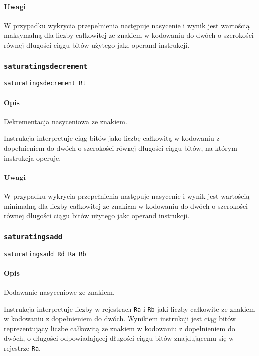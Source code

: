 \paragraph*{Uwagi}

W przypadku wykrycia przepełnienia następuje nasycenie i wynik jest wartością
maksymalną dla liczby całkowitej ze znakiem w kodowaniu do dwóch o szerokości
równej długości ciągu bitów użytego jako operand instrukcji.

\subsubsection{\texttt{saturatingsdecrement}}

\begin{lstlisting}
saturatingsdecrement Rt
\end{lstlisting}

\paragraph*{Opis} Dekrementacja nasyceniowa ze znakiem.

Instrukcja interpretuje ciąg bitów jako liczbę całkowitą w kodowaniu z
dopełnieniem do dwóch o szerokości równej długości ciągu bitów, na którym
instrukcja operuje.

\paragraph*{Uwagi}

W przypadku wykrycia przepełnienia następuje nasycenie i wynik jest wartością
minimalną dla liczby całkowitej ze znakiem w kodowaniu do dwóch o szerokości
równej długości ciągu bitów użytego jako operand instrukcji.

\subsubsection{\texttt{saturatingsadd}}

\begin{lstlisting}
saturatingsadd Rd Ra Rb
\end{lstlisting}

\paragraph*{Opis} Dodawanie nasyceniowe ze znakiem.

Instrukcja interpretuje liczby w rejestrach \texttt{Ra} i \texttt{Rb} jaki
liczby całkowite ze znakiem w kodowaniu z dopełnieniem do dwóch. Wynikiem
instrukcji jest ciąg bitów reprezentujący liczbe całkowitą ze znakiem w
kodowaniu z dopełnieniem do dwóch, o długości odpowiadającej długości ciągu
bitów znajdującemu się w rejestrze \texttt{Ra}.

